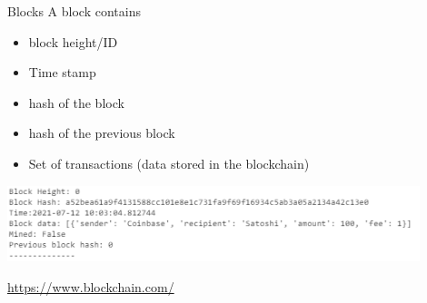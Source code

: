 \documentclass{beamer}
\begin{document}
\begin{frame}{Blocks}
A block contains
\begin{itemize}
  \item block height/ID
  \item Time stamp
  \item hash of the block
  \item hash of the previous block
  \item Set of transactions (data stored in the blockchain)
\end{itemize}
\begin{center}
\includegraphics[width=0.9\textwidth]{../../Figures/genesis_block.png}
\end{center}
\url{https://www.blockchain.com/}
\end{frame}
\end{document}
